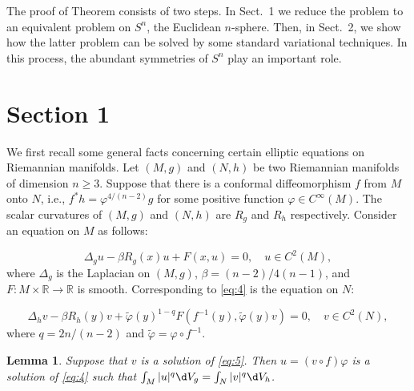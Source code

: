 \documentclass[11pt]{article}
\newtheorem{lemma}{Lemma}
\begin{document}
The proof of Theorem consists of two steps.
In Sect.~1 we reduce the problem to an equivalent problem on $S^n$, the Euclidean $n$-sphere.
Then, in Sect.~2, we show how the latter problem can be solved by some standard variational 
techniques. In this process, the abundant symmetries of $S^n$ play an important role.

\section*{Section 1}

We first recall some general facts concerning certain elliptic equations on
Riemannian manifolds. Let $(M, g)$ and $(N, h)$ be two Riemannian manifolds of
dimension $n \geq 3$. Suppose that there is a conformal diffeomorphism $f$ from $M$ onto $N$, 
i.e., $f^* h=\varphi^{4 /(n-2)} g$ for some positive function $\varphi \in C^{\infty}(M)$.
The scalar curvatures of $(M, g)$ and $(N, h)$ are $R_g$ and $R_h$ respectively.
Consider an equation on $M$ as follows:

\begin{equation}\label{eq:4}
  \Delta_g u-\beta R_g(x) u+F(x, u)=0, \quad u \in C^2(M),  
\end{equation}
where $\Delta_g$ is the Laplacian on $(M, g)$, $\beta=(n-2) / 4(n-1)$,
and $F: M \times \mathbb{R} \rightarrow \mathbb{R}$ is smooth.
Corresponding to \eqref{eq:4} is the equation on $N$:

\begin{equation}\label{eq:5}
  \Delta_h v-\beta R_h(y) v+\tilde{\varphi}(y)^{1-q} F\left(f^{-1}(y), \tilde{\varphi}(y) v\right)=0, \quad v \in C^2(N),  
\end{equation}
where $q=2 n /(n-2)$ and $\tilde{\varphi}=\varphi \circ f^{-1}$.

\begin{lemma}\label{lemma:1}
  Suppose that $v$ is a solution of \eqref{eq:5}. Then $u=(v \circ f) \varphi$ is
  a solution of \eqref{eq:4} such that $\int_M|u|^q \d V_g=\int_N|v|^q \d V_h$.
\end{lemma}
\end{document}
